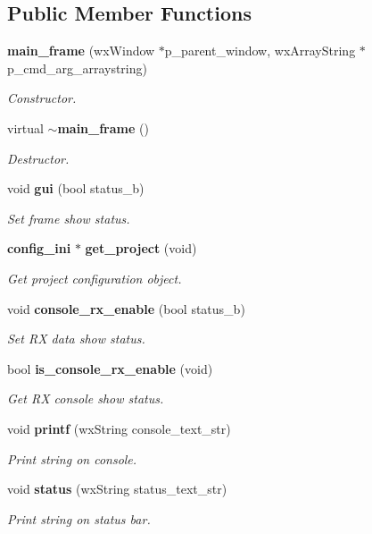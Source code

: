 \subsection*{Public Member Functions}
\begin{DoxyCompactItemize}
\item 
\textbf{ main\+\_\+frame} (wx\+Window $\ast$p\+\_\+parent\+\_\+window, wx\+Array\+String $\ast$p\+\_\+cmd\+\_\+arg\+\_\+arraystring)
\begin{DoxyCompactList}\small\item\em Constructor. \end{DoxyCompactList}\item 
virtual \textbf{ $\sim$main\+\_\+frame} ()
\begin{DoxyCompactList}\small\item\em Destructor. \end{DoxyCompactList}\item 
void \textbf{ gui} (bool status\+\_\+b)
\begin{DoxyCompactList}\small\item\em Set frame show status. \end{DoxyCompactList}\item 
\textbf{ config\+\_\+ini} $\ast$ \textbf{ get\+\_\+project} (void)
\begin{DoxyCompactList}\small\item\em Get project configuration object. \end{DoxyCompactList}\item 
void \textbf{ console\+\_\+rx\+\_\+enable} (bool status\+\_\+b)
\begin{DoxyCompactList}\small\item\em Set RX data show status. \end{DoxyCompactList}\item 
bool \textbf{ is\+\_\+console\+\_\+rx\+\_\+enable} (void)
\begin{DoxyCompactList}\small\item\em Get RX console show status. \end{DoxyCompactList}\item 
void \textbf{ printf} (wx\+String console\+\_\+text\+\_\+str)
\begin{DoxyCompactList}\small\item\em Print string on console. \end{DoxyCompactList}\item 
void \textbf{ status} (wx\+String status\+\_\+text\+\_\+str)
\begin{DoxyCompactList}\small\item\em Print string on status bar. \end{DoxyCompactList}\item 

\end{DoxyCompactItemize}

